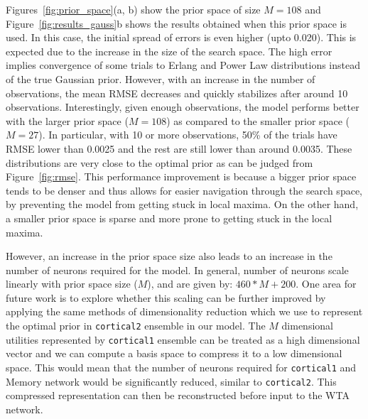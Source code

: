 \documentclass[10pt,letterpaper]{article}
\begin{document}
Figures~\ref{fig:prior_space}(a, b) show the prior space of size $M=108$ and Figure~\ref{fig:results_gauss}b shows the results obtained when this prior space is used. In this case, the initial spread of errors is even higher (upto 0.020).  This is expected due to the increase in the size of the search space. The high error implies convergence of some trials to Erlang and Power Law distributions instead of the true Gaussian prior. However, with an increase in the number of observations, the mean RMSE decreases and quickly stabilizes after around 10 observations. Interestingly, given enough observations, the model performs better with the larger prior space ($M=108$) as compared to the smaller prior space ($M=27$). In particular, with 10 or more observations, 50\% of the trials have RMSE lower than 0.0025 and the rest are still lower than around 0.0035. These distributions are very close to the optimal prior as can be judged from Figure~\ref{fig:rmse}. This performance improvement is because a bigger prior space tends to be denser and thus allows for easier navigation through the search space, by preventing the model from getting stuck in local maxima. On the other hand, a smaller prior space is sparse and more prone to getting stuck in the local maxima. 

However, an increase in the prior space size also leads to an increase in the number of neurons required for the model. In general, number of neurons scale linearly with prior space size ($M$), and are given by: $460*M + 200$. One area for future work is to explore whether this scaling can be further improved by applying the same methods of dimensionality reduction which we use to represent the optimal prior in \texttt{cortical2} ensemble in our model. The $M$ dimensional utilities represented by \texttt{cortical1} ensemble can be treated as a high dimensional vector and we can compute a basis space to compress it to a low dimensional space. This would mean that the number of neurons required for \texttt{cortical1} and Memory network would be significantly reduced, similar to \texttt{cortical2}. This compressed representation can then be reconstructed before input to the WTA network.  





\end{document}
